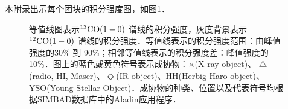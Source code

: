 \documentclass[UTF8, nocolorlinks]{pkuthss}
\newcommand{\coaa}{$\rm^{12}CO(1-0)$ }
\newcommand{\cobb}{$\rm^{13}CO(1-0)$ }
\begin{document}
	本附录出示每个团块的积分强度图，如图\ref{Fig.Map}．

	\begin{figure}[h]
		\caption{等值线图表示\cobb 谱线的积分强度，灰度背景表示\coaa 谱线的积分强度．等值线表示的积分强度范围：由峰值强度的30\% 到 90\%；相邻等值线表示的积分强度差：峰值强度的10\%．图上的蓝色或黄色符号表示成协物：$\times$(X-ray object)、 $\triangle$(radio, {HI}, Maser)、$\Diamond$(IR object)、HH(Herbig-Haro object)、YSO(Young Stellar Object)．成协物的种类、位置以及代表符号均根据SIMBAD数据库中的Aladin应用程序．\label{Fig.Map}}
	\end{figure}
		\vspace{-18mm}

\backmatter




\end{document}
